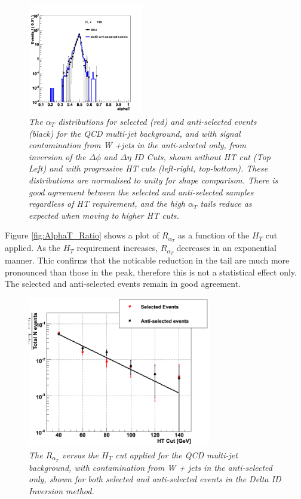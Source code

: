 \begin{figure}[h!]
\hspace*{3mm}
\includegraphics[width=50mm]{Plots/w-alphaT-6}
\caption{\textit{The $\alpha_{T}$ distributions for selected (red) and anti-selected events (black) for the QCD multi-jet background, and with signal contamination from W +jets in the anti-selected only, from inversion of the $\Delta \phi$ and $\Delta \eta$ ID Cuts, shown without HT cut (Top Left) and with progressive HT cuts (left-right, top-bottom). These distributions are normalised to unity for shape comparison. There is good agreement between the selected and anti-selected samples regardless of HT requirement, and the high $\alpha_{T}$ tails reduce as expected when moving to higher HT cuts.}}
\label{fig:w-AlphaTbyHT}
\end{figure}

 Figure \ref{fig:AlphaT_Ratio} shows a plot of $R_{\alpha_T}$ as a function of the $H_{T}$ cut applied. As the $H_{T}$ requirement increases, $R_{\alpha_T}$ decreases in an exponential manner. Thic confirms that the noticable reduction in the tail are much more pronounced than those in the peak, therefore this is not a statistical effect only. The selected and anti-selected events remain in good agreement.

\begin{figure}[h!]
\begin{center}
\includegraphics[width=80mm]{Plots/w-alphaTratio}
\end{center}
\caption{\textit{The $R_{\alpha_T}$ versus the $H_{T}$ cut applied for the QCD multi-jet background, with contamination from W + jets in the anti-selected only, shown for both selected and anti-selected events in the Delta ID Inversion method.}}
\label{fig:w-AlphaT_Ratio}
\end{figure}

